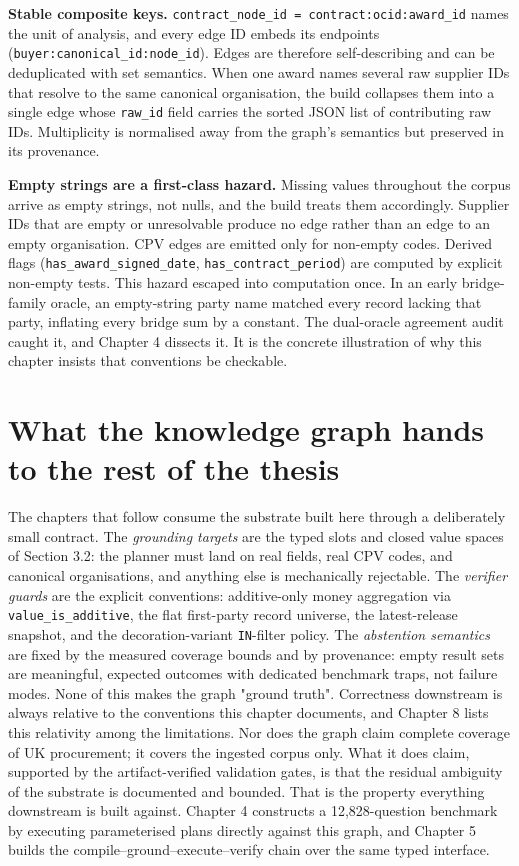 \documentclass[10pt]{article} %
\begin{document}
\textbf{Stable composite keys.} \texttt{contract\_node\_id = contract:{ocid}:{award\_id}} names the unit of analysis, and every edge ID embeds its endpoints (\texttt{buyer:{canonical\_id}:{node\_id}}). Edges are therefore self-describing and can be deduplicated with set semantics. When one award names several raw supplier IDs that resolve to the same canonical organisation, the build collapses them into a single edge whose \texttt{raw\_id} field carries the sorted JSON list of contributing raw IDs. Multiplicity is normalised away from the graph's semantics but preserved in its provenance.

\textbf{Empty strings are a first-class hazard.} Missing values throughout the corpus arrive as empty strings, not nulls, and the build treats them accordingly. Supplier IDs that are empty or unresolvable produce no edge rather than an edge to an empty organisation. CPV edges are emitted only for non-empty codes. Derived flags (\texttt{has\_award\_signed\_date}, \texttt{has\_contract\_period}) are computed by explicit non-empty tests. This hazard escaped into computation once. In an early bridge-family oracle, an empty-string party name matched every record lacking that party, inflating every bridge sum by a constant. The dual-oracle agreement audit caught it, and Chapter 4 dissects it. It is the concrete illustration of why this chapter insists that conventions be checkable.

\section{What the knowledge graph hands to the rest of the thesis}\label{sec:what-the-knowledge-graph-hands-to-the-re}

The chapters that follow consume the substrate built here through a deliberately small contract. The \emph{grounding targets} are the typed slots and closed value spaces of Section 3.2: the planner must land on real fields, real CPV codes, and canonical organisations, and anything else is mechanically rejectable. The \emph{verifier guards} are the explicit conventions: additive-only money aggregation via \texttt{value\_is\_additive}, the flat first-party record universe, the latest-release snapshot, and the decoration-variant \texttt{IN}-filter policy. The \emph{abstention semantics} are fixed by the measured coverage bounds and by provenance: empty result sets are meaningful, expected outcomes with dedicated benchmark traps, not failure modes. None of this makes the graph "ground truth". Correctness downstream is always relative to the conventions this chapter documents, and Chapter 8 lists this relativity among the limitations. Nor does the graph claim complete coverage of UK procurement; it covers the ingested corpus only. What it does claim, supported by the artifact-verified validation gates, is that the residual ambiguity of the substrate is documented and bounded. That is the property everything downstream is built against. Chapter 4 constructs a 12,828-question benchmark by executing parameterised plans directly against this graph, and Chapter 5 builds the compile--ground--execute--verify chain over the same typed interface.
\end{document}
